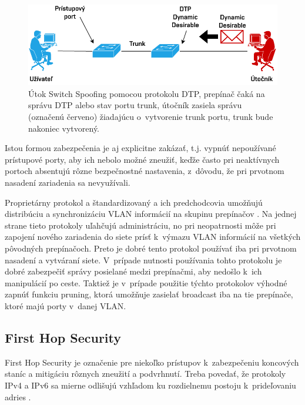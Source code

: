 \begin{figure}[H]
	\begin{center}
		\includegraphics[scale=0.75]{obrazky/switch-spoofing.pdf}
	\end{center}
	\caption[Útok Switch Spoofing pomocou protokolu DTP]{Útok Switch Spoofing pomocou protokolu DTP, prepínač čaká na správu DTP alebo stav portu trunk, útočník zasiela správu (označenú červeno) žiadajúcu o~vytvorenie trunk portu, trunk bude nakoniec vytvorený.}
	\label{fig:switch-spoofing}
\end{figure} 


Istou formou zabezpečenia je aj explicitne zakázať, t.j. vypnúť nepoužívané prístupové porty, aby ich nebolo možné zneužiť, keďže často pri neaktívnych portoch absentujú rôzne bezpečnostné nastavenia, z~dôvodu, že pri prvotnom nasadení zariadenia sa nevyužívali.  

Proprietárny protokol  a štandardizovaný  a ich predchodcovia umožňujú distribúciu a synchronizáciu VLAN informácií na skupinu prepínačov \cite{Vyncke2008}. Na jednej strane tieto protokoly uľahčujú administráciu, no pri neopatrnosti môže pri zapojení nového zariadenia do siete prísť k~výmazu VLAN informácií na všetkých pôvodných prepínačoch. Preto je dobré tento protokol používať iba pri prvotnom nasadení a vytváraní siete. V~prípade nutnosti používania tohto protokolu je dobré zabezpečiť správy posielané medzi prepínačmi, aby nedošlo k~ich manipulácií po ceste. Taktiež je v~prípade použitie týchto protokolov výhodné zapnúť funkciu pruning, ktorá umožňuje zasielať broadcast iba na tie prepínače, ktoré majú porty v~danej VLAN. 


\subsection{First Hop Security}
First Hop Security je označenie pre niekoľko prístupov k~zabezpečeniu koncových staníc a mitigáciu rôznych zneužití a podvrhnutí. Treba povedať, že protokoly IPv4 a IPv6 sa mierne odlišujú vzhľadom ku rozdielnemu postoju k~prideľovaniu adries \cite{Satrapa2019}.

